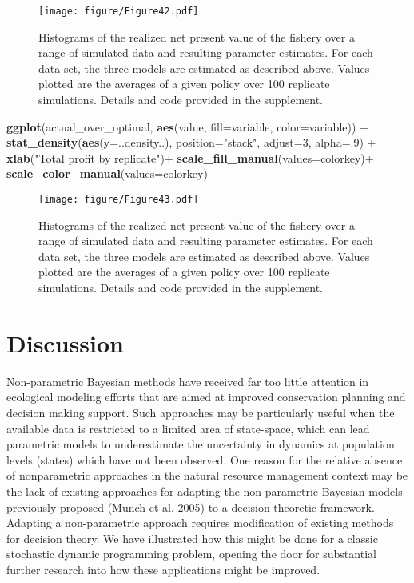 \documentclass[author-year, review]{elsarticle} %
\makeatletter
\newenvironment{Shaded}{}{}
\newcommand{\KeywordTok}[1]{\textcolor[rgb]{0.00,0.44,0.13}{\textbf{{#1}}}}
\newcommand{\DataTypeTok}[1]{\textcolor[rgb]{0.56,0.13,0.00}{{#1}}}
\newcommand{\DecValTok}[1]{\textcolor[rgb]{0.25,0.63,0.44}{{#1}}}
\newcommand{\StringTok}[1]{\textcolor[rgb]{0.25,0.44,0.63}{{#1}}}
\newcommand{\NormalTok}[1]{{#1}}
\def\maxwidth{\ifdim\Gin@nat@width>\linewidth\linewidth
\else\Gin@nat@width\fi}
\let\Oldincludegraphics\includegraphics
\renewcommand{\includegraphics}[1]{\Oldincludegraphics[width=\maxwidth]{#1}}
\makeatother
\begin{document}
\begin{figure}[htbp]
\centering
\texttt{[image: figure/Figure42.pdf]}
\caption{Histograms of the realized net present value of the fishery
over a range of simulated data and resulting parameter estimates. For
each data set, the three models are estimated as described above. Values
plotted are the averages of a given policy over 100 replicate
simulations. Details and code provided in the supplement.}
\end{figure}

\begin{Shaded}
\begin{Highlighting}[]

\KeywordTok{ggplot}\NormalTok{(actual_over_optimal, }\KeywordTok{aes}\NormalTok{(value, }\DataTypeTok{fill=}\NormalTok{variable, }\DataTypeTok{color=}\NormalTok{variable)) + }
  \KeywordTok{stat_density}\NormalTok{(}\KeywordTok{aes}\NormalTok{(}\DataTypeTok{y=}\NormalTok{..density..), }\DataTypeTok{position=}\StringTok{"stack"}\NormalTok{, }\DataTypeTok{adjust=}\DecValTok{3}\NormalTok{, }\DataTypeTok{alpha=}\NormalTok{.}\DecValTok{9}\NormalTok{) + }
  \KeywordTok{xlab}\NormalTok{(}\StringTok{"Total profit by replicate"}\NormalTok{)+ }\KeywordTok{scale_fill_manual}\NormalTok{(}\DataTypeTok{values=}\NormalTok{colorkey)+ }\KeywordTok{scale_color_manual}\NormalTok{(}\DataTypeTok{values=}\NormalTok{colorkey)}
\end{Highlighting}
\end{Shaded}

\begin{figure}[htbp]
\centering
\texttt{[image: figure/Figure43.pdf]}
\caption{Histograms of the realized net present value of the fishery
over a range of simulated data and resulting parameter estimates. For
each data set, the three models are estimated as described above. Values
plotted are the averages of a given policy over 100 replicate
simulations. Details and code provided in the supplement.}
\end{figure}

\section{Discussion}

Non-parametric Bayesian methods have received far too little attention
in ecological modeling efforts that are aimed at improved conservation
planning and decision making support. Such approaches may be
particularly useful when the available data is restricted to a limited
area of state-space, which can lead parametric models to underestimate
the uncertainty in dynamics at population levels (states) which have not
been observed. One reason for the relative absence of nonparametric
approaches in the natural resource management context may be the lack of
existing approaches for adapting the non-parametric Bayesian models
previously proposed (Munch et al. 2005) to a decision-theoretic
framework. Adapting a non-parametric approach requires modification of
existing methods for decision theory. We have illustrated how this might
be done for a classic stochastic dynamic programming problem, opening
the door for substantial further research into how these applications
might be improved.
\end{document}
